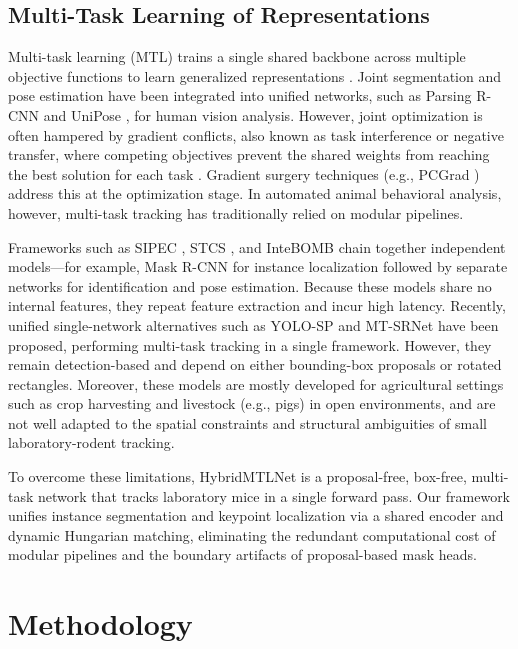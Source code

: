 \documentclass[runningheads]{llncs}
\begin{document}
\subsection{Multi-Task Learning of Representations}
Multi-task learning (MTL) trains a single shared backbone across multiple objective functions to learn generalized representations \cite{caruana1997multitask}. Joint segmentation and pose estimation have been integrated into unified networks, such as Parsing R-CNN \cite{yang2019parsingrcnn} and UniPose \cite{artacho2020unipose}, for human vision analysis. However, joint optimization is often hampered by gradient conflicts, also known as task interference or negative transfer, where competing objectives prevent the shared weights from reaching the best solution for each task \cite{kendall2018multitask,standley2020tasks}. Gradient surgery techniques (e.g., PCGrad \cite{yu2020pcgrad}) address this at the optimization stage. In automated animal behavioral analysis, however, multi-task tracking has traditionally relied on modular pipelines.

Frameworks such as SIPEC \cite{marks2022sipec}, STCS \cite{tang2024stcs}, and InteBOMB \cite{zhai2025intebomb} chain together independent models---for example, Mask R-CNN for instance localization followed by separate networks for identification and pose estimation. Because these models share no internal features, they repeat feature extraction and incur high latency. Recently, unified single-network alternatives such as YOLO-SP \cite{jiang2025yolosp} and MT-SRNet \cite{liu2025mtsrnet} have been proposed, performing multi-task tracking in a single framework. However, they remain detection-based and depend on either bounding-box proposals or rotated rectangles. Moreover, these models are mostly developed for agricultural settings such as crop harvesting and livestock (e.g., pigs) in open environments, and are not well adapted to the spatial constraints and structural ambiguities of small laboratory-rodent tracking.

To overcome these limitations, HybridMTLNet is a proposal-free, box-free, multi-task network that tracks laboratory mice in a single forward pass. Our framework unifies instance segmentation and keypoint localization via a shared encoder and dynamic Hungarian matching, eliminating the redundant computational cost of modular pipelines and the boundary artifacts of proposal-based mask heads.

\section{Methodology}
\end{document}
